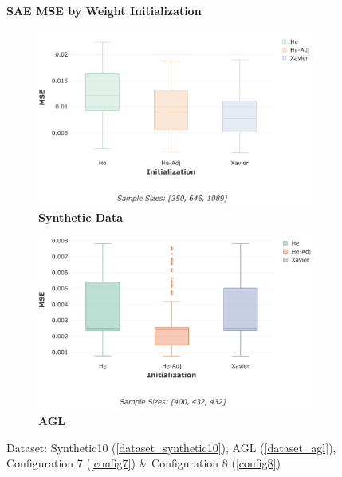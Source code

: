 \documentclass[a4paper,11pt,oneside]{article}
\theoremstyle{plain}
\theoremstyle{definition}
\begin{document}
	\begin{figure}[H]
		\centering
		\textbf{SAE MSE by Weight Initialization}
		\begin{subfigure}{.5\textwidth}
			\centering 
			\includegraphics[scale=0.29]{images/results/8_4_weight_init/synthetic_mse_init.png}
			\caption{\textbf{Synthetic Data} 
				\newline }
			\label{figure-synthetic_mse_init}
		\end{subfigure}%
		\begin{subfigure}{.5\textwidth}
			\centering 
			\includegraphics[scale=0.28]{images/results/8_4_weight_init/agl_mse_init.png}
			\caption{\textbf{AGL} 
				\newline }
			\label{figure-agl_mse_init}
		\end{subfigure}
		\caption[SAE MSE by Weight Initialization]
		{Dataset: Synthetic10 (\ref{dataset_synthetic10}), AGL (\ref{dataset_agl}), Configuration 7 (\ref{config7}) \& Configuration 8 (\ref{config8})
}
\end{figure}
\end{document}
